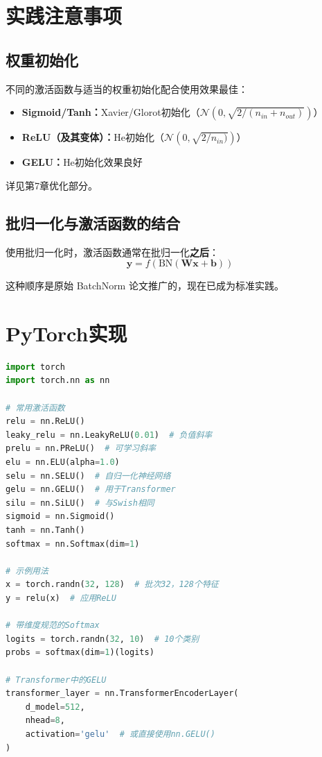 \section{实践注意事项}

\subsection{权重初始化}

不同的激活函数与适当的权重初始化配合使用效果最佳：

\begin{itemize}
    \item \textbf{Sigmoid/Tanh：}Xavier/Glorot初始化（$\mathcal{N}(0, \sqrt{2/(n_{in} + n_{out})})$）
    \item \textbf{ReLU（及其变体）：}He初始化（$\mathcal{N}(0, \sqrt{2/n_{in})})$）
    \item \textbf{GELU：}He初始化效果良好
\end{itemize}

详见第7章优化部分。

\subsection{批归一化与激活函数的结合}

使用批归一化时，激活函数通常在批归一化\textbf{之后}：
\begin{equation}
\mathbf{y} = f(\text{BN}(\mathbf{W}\mathbf{x} + \mathbf{b}))
\end{equation}

这种顺序是原始 BatchNorm 论文推广的，现在已成为标准实践。

\section{PyTorch实现}

\begin{code}
    \label{code:activations_pytorch}
\begin{lstlisting}[language=python]
import torch
import torch.nn as nn

# 常用激活函数
relu = nn.ReLU()
leaky_relu = nn.LeakyReLU(0.01)  # 负值斜率
prelu = nn.PReLU()  # 可学习斜率
elu = nn.ELU(alpha=1.0)
selu = nn.SELU()  # 自归一化神经网络
gelu = nn.GELU()  # 用于Transformer
silu = nn.SiLU()  # 与Swish相同
sigmoid = nn.Sigmoid()
tanh = nn.Tanh()
softmax = nn.Softmax(dim=1)

# 示例用法
x = torch.randn(32, 128)  # 批次32，128个特征
y = relu(x)  # 应用ReLU

# 带维度规范的Softmax
logits = torch.randn(32, 10)  # 10个类别
probs = softmax(dim=1)(logits)

# Transformer中的GELU
transformer_layer = nn.TransformerEncoderLayer(
    d_model=512, 
    nhead=8,
    activation='gelu'  # 或直接使用nn.GELU()
)
\end{lstlisting}
\end{code}

